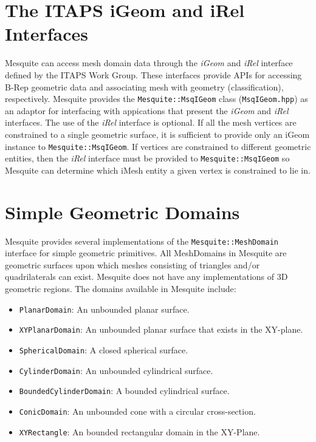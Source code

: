 \section{The ITAPS iGeom and iRel Interfaces} \label{sec:ITAPS}

Mesquite can access mesh domain data through the \emph{iGeom} and \emph{iRel} interface defined by the ITAPS Work Group.  These interfaces provide APIs for accessing B-Rep geometric data and associating mesh with geometry (classification), respectively.  Mesquite provides the \texttt{Mesquite::MsqIGeom} class (\texttt{MsqIGeom.hpp}) as an adaptor for interfacing with appications that present the \emph{iGeom} and \emph{iRel} interfaces.  The use of the \emph{iRel} interface is optional.  If all the mesh vertices are constrained to a single geometric surface, it is sufficient to provide only an iGeom instance to \texttt{Mesquite::MsqIGeom}.  If vertices are constrained to different geometric entities, then the \emph{iRel} interface must be provided to \texttt{Mesquite::MsqIGeom} so Mesquite can determine which iMesh entity a given vertex is constrained to lie in.


\section{Simple Geometric Domains} \label{sec:MsqGeom}

Mesquite provides several implementations of the
\texttt{Mesquite::MeshDomain} interface for simple geometric primitives. All MeshDomains in Mesquite are geometric surfaces upon which meshes consisting of triangles and/or quadrilaterals can exist. Mesquite does not have any implementations of 3D geometric regions. The domains available in Mesquite include:
\begin{itemize}
\item \texttt{PlanarDomain}: An unbounded planar surface.
\item \texttt{XYPlanarDomain}: An unbounded planar surface that exists in the XY-plane.
\item \texttt{SphericalDomain}: A closed spherical surface.
\item \texttt{CylinderDomain}: An unbounded cylindrical surface.
\item \texttt{BoundedCylinderDomain}: A bounded cylindrical surface.
\item \texttt{ConicDomain}: An unbounded cone with a circular cross-section.
\item \texttt{XYRectangle}: An bounded rectangular domain in the XY-Plane.
\end{itemize}

